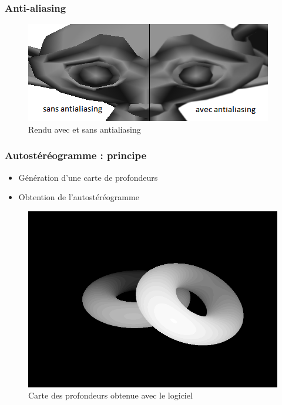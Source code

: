 \documentclass{beamer}
\begin{document}

\begin{frame}
\frametitle{Anti-aliasing}
\begin{figure}
\centering
\includegraphics[scale=0.8]{antialiasing.png}
\caption{Rendu avec et sans antialiasing}
\end{figure}

\end{frame}


%
\begin{frame}
\frametitle{Autostéréogramme : principe}

\begin{itemize}[label=$\bullet$]
\item Génération d'une carte de profondeurs
\item Obtention de l'autostéréogramme
\end{itemize}

\begin{figure}
\centering
\includegraphics[scale=0.22]{donutdepth.png}
\caption{Carte des profondeurs obtenue avec le logiciel}
\end{figure}
\end{frame}
\end{document}
